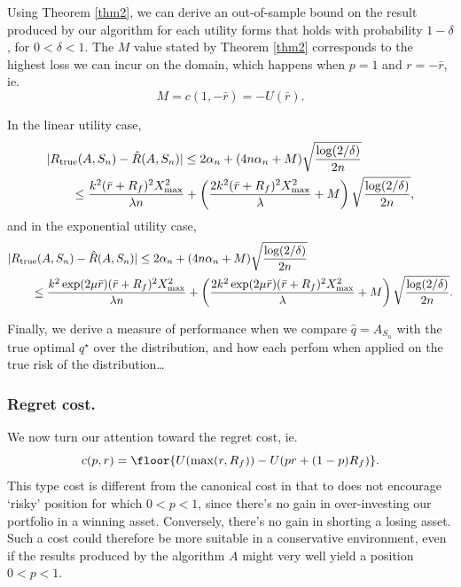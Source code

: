 \begin{rem}
  Using Theorem \ref{thm2}, we can derive an out-of-sample bound on the result produced by
  our algorithm for each utility forms that holds with probability $1-\delta$, for
  $0<\delta<1$. The $M$ value stated by Theorem \ref{thm2} corresponds to the highest loss
  we can incur on the domain, which happens when $p=1$ and $r=-\bar r$, ie.
  \begin{equation}
    M = c(1,-\bar r) = -U(\bar r).
  \end{equation}

  In the linear utility case, 
  \begin{align}
    &|R_{\mathrm{true}}(A,S_n) - \hat{R}(A,S_n)| \leq 2\alpha_n + (4n\alpha_n +
      M)\sqrt{\frac{\log(2/\delta)}{2n}}\\
    &\qquad \leq \frac{k^2(\bar r+R_f)^2X^2_{\max}}{\lambda n} + \left(\frac{2k^2(\bar r+R_f)^2X^2_{\max}}{\lambda} + M\right)\sqrt{\frac{\log(2/\delta)}{2n}},
  \end{align}
  and in the exponential utility case, 
  \begin{align}
    &|R_{\mathrm{true}}(A,S_n) - \hat{R}(A,S_n)| \leq 2\alpha_n + (4n\alpha_n +
      M)\sqrt{\frac{\log(2/\delta)}{2n}}\\
    &\qquad \leq \frac{k^2 \exp(2\mu\bar r)(\bar r + R_f)^2 X^2_{\max}}{\lambda n} + \left(\frac{2k^2 \exp(2\mu\bar r)(\bar r + R_f)^2 X^2_{\max}}{\lambda} + M\right)\sqrt{\frac{\log(2/\delta)}{2n}}.
  \end{align}
\end{rem}

\begin{rem}
  Finally, we derive a measure of performance when we compare $\hat q=A_{S_n}$ with the true
  optimal $q^\star$ over the distribution, and how each perfom when applied on the true
  risk of the distribution\ldots
\end{rem}

\subsubsection{Regret cost.}

We now turn our attention toward the regret cost, ie.
\begin{equation}
  c(p,r) = \floor{U(\max(r,R_f)) - U(pr + (1-p)R_f)}.
\end{equation}
This type cost is different from the canonical cost in that to does not encourage `risky'
position for which $0<p<1$, since there's no gain in over-investing our portfolio in a
winning asset. Conversely, there's no gain in shorting a losing asset. Such a cost could
therefore be more suitable in a conservative environment, even if the results produced by
the algorithm $A$ might very well yield a position $0<p<1$.

